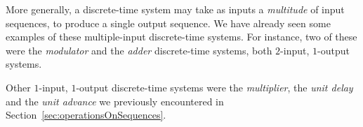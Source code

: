 \documentclass[\documentfontsize, twocolumn]{\classname}
\begin{document}
More generally, a discrete-time system may take as inputs a \emph{multitude} of input sequences, to produce a single output sequence. We have already seen some examples of these multiple-input discrete-time systems. For instance, two of these were the \emph{modulator} and the \emph{adder} discrete-time systems, both $2$-input, $1$-output systems.
\begin{center}
\end{center}
Other $1$-input, $1$-output discrete-time systems were the \emph{multiplier}, the \emph{unit delay} and the \emph{unit advance} we previously encountered in Section~\ref{sec:operationsOnSequences}.
\end{document}
